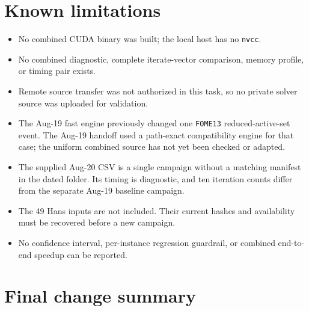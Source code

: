 \documentclass[10pt,a4paper]{article}
\begin{document}
\section{Known limitations}

\begin{itemize}
  \item No combined CUDA binary was built; the local host has no \texttt{nvcc}.
  \item No combined diagnostic, complete iterate-vector comparison, memory profile, or timing pair exists.
  \item Remote source transfer was not authorized in this task, so no private solver source was uploaded for validation.
  \item The Aug-19 fast engine previously changed one \texttt{FOME13} reduced-active-set event.  The Aug-19 handoff used a path-exact compatibility engine for that case; the uniform combined source has not yet been checked or adapted.
  \item The supplied Aug-20 CSV is a single campaign without a matching manifest in the dated folder.  Its timing is diagnostic, and ten iteration counts differ from the separate Aug-19 baseline campaign.
  \item The 49 Hans inputs are not included.  Their current hashes and availability must be recovered before a new campaign.
  \item No confidence interval, per-instance regression guardrail, or combined end-to-end speedup can be reported.
\end{itemize}

\section{Final change summary}
\end{document}
